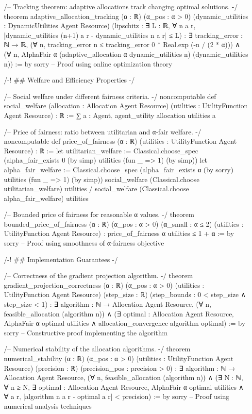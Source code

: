 /--
Tracking theorem: adaptive allocations track changing optimal solutions.
-/
theorem adaptive_allocation_tracking (α : ℝ) (α_pos : α > 0)
    (dynamic_utilities : DynamicUtilities Agent Resource)
    (lipschitz : ∃ L : ℝ, ∀ n a r, 
      |dynamic_utilities (n+1) a r - dynamic_utilities n a r| ≤ L) :
    ∃ tracking_error : ℕ → ℝ,
      (∀ n, tracking_error n ≤ tracking_error 0 * Real.exp (-n / (2 * α))) ∧
      (∀ n, AlphaFair α (adaptive_allocation α dynamic_utilities n) 
                      (dynamic_utilities n)) := by
  sorry -- Proof using online optimization theory

/-! ## Welfare and Efficiency Properties -/

/--
Social welfare under different fairness criteria.
-/
noncomputable def social_welfare (allocation : Allocation Agent Resource)
    (utilities : UtilityFunction Agent Resource) : ℝ :=
  ∑ a : Agent, agent_utility allocation utilities a

/--
Price of fairness: ratio between utilitarian and α-fair welfare.
-/
noncomputable def price_of_fairness (α : ℝ) 
    (utilities : UtilityFunction Agent Resource) : ℝ :=
  let utilitarian_welfare := Classical.choose_spec 
    (alpha_fair_exists 0 (by simp) utilities (fun _ => 1) (by simp))
  let alpha_fair_welfare := Classical.choose_spec 
    (alpha_fair_exists α (by sorry) utilities (fun _ => 1) (by simp))
  social_welfare (Classical.choose utilitarian_welfare) utilities /
  social_welfare (Classical.choose alpha_fair_welfare) utilities

/--
Bounded price of fairness for reasonable α values.
-/
theorem bounded_price_of_fairness (α : ℝ) (α_pos : α > 0) (α_small : α ≤ 2)
    (utilities : UtilityFunction Agent Resource) :
    price_of_fairness α utilities ≤ 1 + α := by
  sorry -- Proof using smoothness of α-fairness objective

/-! ## Implementation Guarantees -/

/--
Correctness of the gradient projection algorithm.
-/
theorem gradient_projection_correctness (α : ℝ) (α_pos : α > 0)
    (utilities : UtilityFunction Agent Resource)
    (step_size : ℝ) (step_bounds : 0 < step_size ∧ step_size < 1) :
    ∃ algorithm : ℕ → Allocation Agent Resource,
      (∀ n, feasible_allocation (algorithm n)) ∧
      (∃ optimal : Allocation Agent Resource,
         AlphaFair α optimal utilities ∧
         allocation_convergence algorithm optimal) := by
  sorry -- Constructive proof implementing the algorithm

/--
Numerical stability of the allocation algorithms.
-/
theorem numerical_stability (α : ℝ) (α_pos : α > 0)
    (utilities : UtilityFunction Agent Resource)
    (precision : ℝ) (precision_pos : precision > 0) :
    ∃ algorithm : ℕ → Allocation Agent Resource,
      (∀ n, feasible_allocation (algorithm n)) ∧
      (∃ N : ℕ, ∀ n ≥ N,
         ∃ optimal : Allocation Agent Resource,
           AlphaFair α optimal utilities ∧
           ∀ a r, |algorithm n a r - optimal a r| < precision) := by
  sorry -- Proof using numerical analysis techniques

